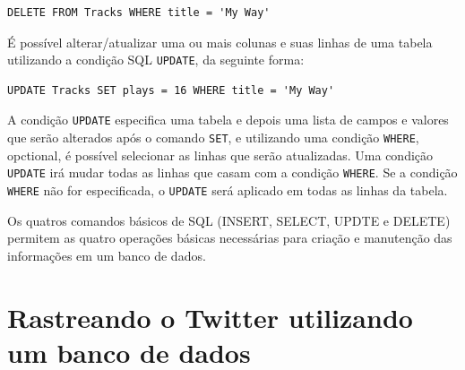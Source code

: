 \beforeverb
\begin{verbatim}
DELETE FROM Tracks WHERE title = 'My Way'
\end{verbatim}
\afterverb
%
%
É possível alterar/atualizar uma ou mais colunas e suas linhas de uma tabela
utilizando a condição SQL {\tt UPDATE}, da seguinte forma:

\beforeverb
\begin{verbatim}
UPDATE Tracks SET plays = 16 WHERE title = 'My Way'
\end{verbatim}
\afterverb
%
%
A condição {\tt UPDATE} especifica uma tabela e depois uma lista de campos e
valores que serão alterados após o comando {\tt SET}, e utilizando uma condição
{\tt WHERE}, opctional, é possível selecionar as linhas que serão atualizadas.
Uma condição {\tt UPDATE} irá mudar todas as linhas que casam com a condição
{\tt WHERE}. Se a condição {\tt WHERE} não for especificada, o {\tt UPDATE}
será aplicado em todas as linhas da tabela.


Os quatros comandos básicos de SQL (INSERT, SELECT, UPDTE e DELETE) permitem
as quatro operações básicas necessárias para criação e manutenção das
informações em um banco de dados.

\section{Rastreando o Twitter utilizando um banco de dados}


